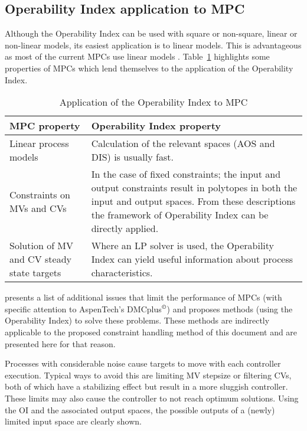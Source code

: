 \subsection{Operability Index application to MPC}
Although the  Operability Index can be used with square or non-square, linear or non-linear models, its easiest application is to linear models. 
This is advantageous as most of the current MPCs use linear models \citep{vinsonphd}.
Table~\ref{tab:mpcoi} highlights some properties of MPCs which lend themselves to the  application of the Operability Index.%
%
\begin{table}[htbp]
  \centering
  \caption[Application of the Operability Index to MPC]{Application of the
    Operability Index to MPC \citep{vinsonphd}}
  \label{tab:mpcoi}
    \begin{tabular}{p{6cm} p{9cm}}
      \toprule
      MPC property & Operability Index property \\
      \midrule
      Linear process models & Calculation of the relevant spaces (AOS and DIS) is usually fast.\\[1.3ex]
      Constraints on MVs and CVs & In the case of fixed constraints; the input and output constraints result in polytopes in both the input and output spaces. 
From these descriptions the framework of Operability Index can be directly applied.\\[1.3ex]
      Solution of MV and CV steady state targets  & Where an LP solver is used, the Operability Index can yield useful information about process characteristics.\\
      \bottomrule
    \end{tabular}
\end{table}

\citet{vinsonphd} presents a list of additional issues that limit the performance of MPCs (with specific attention to AspenTech's DMCplus$^{\copyright}$) and proposes methods (using the Operability Index) to solve these problems. 
These methods are indirectly applicable to the proposed constraint handling method of this document and are presented here for that reason. 

Processes with considerable noise cause targets to move with each controller execution.
Typical ways to avoid this are limiting MV stepsize or filtering CVs, both of which have a stabilizing effect but result in a more sluggish controller. 
These limits may also cause the controller to not reach optimum solutions.
Using the OI and the associated output spaces, the possible outputs of a (newly) limited input space are clearly shown.
    
